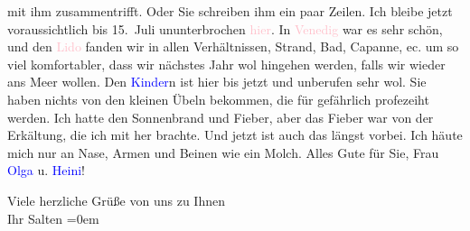                mit ihm zusammentrifft. Oder Sie schreiben ihm ein paar Zeilen. Ich bleibe jetzt
               voraussichtlich bis 15. Juli ununterbrochen \textcolor{pink}{hier}{}\ledrightnote{{$\rightarrow$}\textcolor{pink}{Grado}}. In \textcolor{pink}{Venedig}{}\ledrightnote{\textcolor{pink}{Venedig}} war es sehr schön, und den \textcolor{pink}{Lido}{}\ledrightnote{\textcolor{pink}{Lido}} fanden wir in allen Verhältnissen, Strand, Bad, Capanne,
               ec. um so viel komfortabler, dass wir nächstes Jahr wol hingehen werden, falls wir
               wieder ans Meer wollen. Den \textcolor{blue}{Kinder}{}\ledrightnote{{$\rightarrow$}\textcolor{blue}{Paul Salten}{\newline}{$\rightarrow$}\textcolor{blue}{Anna Katharina Rehmann}}n ist hier bis jetzt und unberufen sehr wol. Sie
               haben nichts von den kleinen Übeln bekommen, die für gefährlich profezeiht werden.
               Ich hatte den Sonnenbrand und Fieber, aber das Fieber war von der Erkältung, die ich
               mit her brachte. Und jetzt ist auch das längst vorbei. Ich häute mich nur an Nase,
               Armen und Beinen wie ein Molch. Alles Gute für Sie, Frau \textcolor{blue}{Olga}{}\ledrightnote{\textcolor{blue}{Olga Schnitzler}} u. \textcolor{blue}{Heini}{}\ledrightnote{\textcolor{blue}{Heinrich Schnitzler}}!\pend
           
\pstart
           Viele herzliche Grüße von uns zu Ihnen {\\[\baselineskip]}Ihr \spacefill\mbox{Salten}\pend
           \leftskip=0em{}\endnumbering{}  
      
